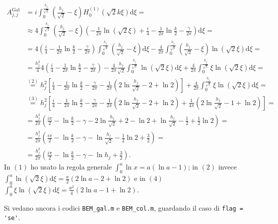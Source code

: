 \begin{align*}
	A_{j,j}^{\text{Gal}} &= i \int_0^{\frac{h_j}{\sqrt{2}}} \left( \frac{h_j}{\sqrt{2}} - \xi \right) H_0^{(1)} (\sqrt{2}k\xi) \mathrm{d}\xi = \\
	&\approx 4 \int_0^{\frac{h_j}{\sqrt{2}}} \left( \frac{h_j}{\sqrt{2}} - \xi \right) \left( -\frac{1}{2\pi}\ln(\sqrt{2}\xi) + \frac{i}{4} - \frac{1}{2\pi}\ln\frac{k}{2} - \frac{\gamma}{2\pi} \right) \mathrm{d}\xi = \\
	&=4 \left( \frac{i}{4} - \frac{1}{2\pi}\ln\frac{k}{2} - \frac{\gamma}{2\pi} \right) \int_0^{\frac{h_j}{\sqrt{2}}} \left( \frac{h_j}{\sqrt{2}} - \xi \right) \mathrm{d}\xi - \frac{4}{2\pi} \int_0^{\frac{h_j}{\sqrt{2}}} \left( \frac{h_j}{\sqrt{2}} - \xi \right) \ln(\sqrt{2}\xi) \mathrm{d}\xi = \\
	&= \frac{h_j^2}{4} 4\left( \frac{i}{4} -\frac{1}{2\pi}\ln\frac{k}{2} - \frac{\gamma}{2\pi} \right) - \frac{4}{2\pi} \frac{h_j}{\sqrt{2}} \int_0^{\frac{h_j}{\sqrt{2}}} \ln(\sqrt{2}\xi) \mathrm{d}\xi + \frac{4}{2\pi} \int_0^{\frac{h_j}{\sqrt{2}}} \xi\ln(\sqrt{2}\xi) \mathrm{d}\xi = \\
	&\overset{(2)}{=} h_j^2 \left[ \frac{i}{4} - \frac{1}{2\pi}\ln\frac{k}{2} - \frac{\gamma}{2\pi} -\frac{1}{2\pi} \left( 2\ln\frac{h_j}{\sqrt{2}} - 2 + \ln2 \right) \right] + \frac{4}{2\pi} \int_0^{\frac{h_j}{\sqrt{2}}} \xi\ln(\sqrt{2}\xi) \mathrm{d}\xi= \\
	&\overset{(3)}{=} h_j^2 \left[ \frac{i}{4} - \frac{1}{2\pi}\ln\frac{k}{2} - \frac{\gamma}{2\pi} -\frac{1}{2\pi} \left( 2\ln\frac{h_j}{\sqrt{2}} - 2 + \ln2 \right) + \frac{1}{4\pi} \left( 2 \ln\frac{h_j}{\sqrt{2}} - 1 + \ln2 \right) \right] = \\
	&= \frac{h_j^2}{2\pi} \left( \frac{i\pi}{2} - \ln\frac{k}{2} - \gamma - 2\ln\frac{h_j}{\sqrt{2}} + 2 - \ln2 + \ln\frac{h_j}{\sqrt{2}} - \frac{1}{2} + \frac{1}{2}\ln2 \right) = \\
	&= \frac{h_j^2}{2\pi} \left( \frac{i\pi}{2} - \ln\frac{k}{2} - \gamma - \ln\frac{h_j}{\sqrt{2}} - \frac{1}{2}\ln2 + \frac{3}{2} \right) = \\
	&= \frac{h_j^2}{2\pi} \left( \frac{i\pi}{2} - \ln\frac{k}{2} - \gamma - \ln{h_j} + \frac{3}{2} \right).
\end{align*}
In $(1)$ ho usato la regola generale $\int_0^a \ln x = a(\ln a - 1)$; in $(2)$ invece $\int_0^a \ln(\sqrt{2}\xi) \mathrm{d}\xi = \frac{a}{2} (2\ln a -2 +\ln2)$ e in $(4)$ $\int_0^a \xi\ln(\sqrt{2}\xi) \mathrm{d}\xi = \frac{a^2}{4} (2\ln a -1 + \ln2)$. 

Si vedano ancora i codici \verb|BEM_gal.m| e \verb|BEM_col.m|, guardando il caso di \verb|flag = 'se'|.



